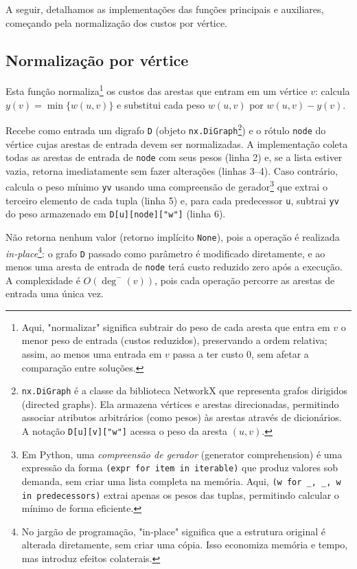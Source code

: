 A seguir, detalhamos as implementações das funções principais e auxiliares, começando pela normalização dos custos por vértice.

\subsection{Normalização por vértice}

Esta função normaliza\footnote{Aqui, "normalizar" significa subtrair do peso de cada aresta que entra em $v$ o menor peso de entrada (custos reduzidos), preservando a ordem relativa; assim, ao menos uma entrada em $v$ passa a ter custo 0, sem afetar a comparação entre soluções.} os custos das arestas que entram em um vértice \(v\): calcula \(y(v)=\min\{w(u,v)\}\) e substitui cada peso \(w(u,v)\) por \(w(u,v)-y(v)\).

Recebe como entrada um digrafo \texttt{D} (objeto \texttt{nx.DiGraph}\footnote{\texttt{nx.DiGraph} é a classe da biblioteca NetworkX que representa grafos dirigidos (directed graphs). Ela armazena vértices e arestas direcionadas, permitindo associar atributos arbitrários (como pesos) às arestas através de dicionários. A notação \texttt{D[u][v]["w"]} acessa o peso da aresta \((u,v)\).}) e o rótulo \texttt{node} do vértice cujas arestas de entrada devem ser normalizadas. A implementação coleta todas as arestas de entrada de \texttt{node} com seus pesos (linha 2) e, se a lista estiver vazia, retorna imediatamente sem fazer alterações (linhas 3--4). Caso contrário, calcula o peso mínimo \texttt{yv} usando uma compreensão de gerador\footnote{Em Python, uma \emph{compreensão de gerador} (generator comprehension) é uma expressão da forma \texttt{(expr for item in iterable)} que produz valores sob demanda, sem criar uma lista completa na memória. Aqui, \texttt{(w for \_, \_, w in predecessors)} extrai apenas os pesos das tuplas, permitindo calcular o mínimo de forma eficiente.} que extrai o terceiro elemento de cada tupla (linha 5) e, para cada predecessor \texttt{u}, subtrai \texttt{yv} do peso armazenado em \texttt{D[u][node]["w"]} (linha 6).

Não retorna nenhum valor (retorno implícito \texttt{None}), pois a operação é realizada \emph{in-place}\footnote{No jargão de programação, "in-place" significa que a estrutura original é alterada diretamente, sem criar uma cópia. Isso economiza memória e tempo, mas introduz efeitos colaterais.}: o grafo \texttt{D} passado como parâmetro é modificado diretamente, e ao menos uma aresta de entrada de \texttt{node} terá custo reduzido zero após a execução. A complexidade é \(O(\deg^-(v))\), pois cada operação percorre as arestas de entrada uma única vez.

